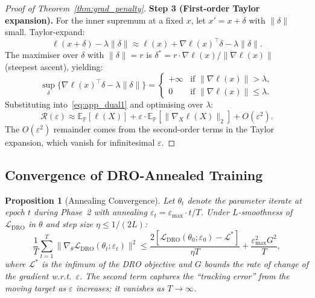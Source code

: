 \documentclass[11pt]{article}
\newtheorem{proposition}[theorem]{Proposition}
\newcommand{\E}{\mathbb{E}}
\newcommand{\PP}{\mathbb{P}}
\begin{document}
\begin{proof}[Proof of Theorem~\ref{thm:grad_penalty}]
\textbf{Step 3 (First-order Taylor expansion).}
For the inner supremum at a fixed $x$, let $x' = x + \delta$ with $\|\delta\|$ small.  Taylor-expand:
\begin{equation}
    \ell(x+\delta) - \lambda\|\delta\| \approx \ell(x) + \nabla\ell(x)^\top\delta - \lambda\|\delta\|.
\end{equation}
The maximiser over $\delta$ with $\|\delta\| = r$ is $\delta^* = r\cdot\nabla\ell(x)/\|\nabla\ell(x)\|$ (steepest ascent), yielding:
\begin{equation}
    \sup_\delta\bigl\{\nabla\ell(x)^\top\delta - \lambda\|\delta\|\bigr\} = \begin{cases} +\infty & \text{if } \|\nabla\ell(x)\| > \lambda, \\ 0 & \text{if } \|\nabla\ell(x)\| \le \lambda. \end{cases}
\end{equation}
Substituting into~\eqref{eq:app_dual1} and optimising over $\lambda$:
\begin{equation}
    \mathcal{R}(\varepsilon) \approx \E_\PP[\ell(X)] + \varepsilon\cdot\E_\PP[\|\nabla_X\ell(X)\|_2] + O(\varepsilon^2).
\end{equation}
The $O(\varepsilon^2)$ remainder comes from the second-order terms in the Taylor expansion, which vanish for infinitesimal $\varepsilon$.
\end{proof}

\subsection{Convergence of DRO-Annealed Training}

\begin{proposition}[Annealing Convergence]
\label{prop:app_convergence}
Let $\theta_t$ denote the parameter iterate at epoch $t$ during Phase~2 with annealing $\varepsilon_t = \varepsilon_{\max}\cdot t/T$.  Under $L$-smoothness of $\mathcal{L}_{\mathrm{DRO}}$ in $\theta$ and step size $\eta \le 1/(2L)$:
\begin{equation}
    \frac{1}{T}\sum_{t=1}^{T}\|\nabla_\theta\mathcal{L}_{\mathrm{DRO}}(\theta_t;\varepsilon_t)\|^2 \le \frac{2[\mathcal{L}_{\mathrm{DRO}}(\theta_0;\varepsilon_0) - \mathcal{L}^*]}{\eta T} + \frac{\varepsilon_{\max}^2 G^2}{T},
\end{equation}
where $\mathcal{L}^*$ is the infimum of the DRO objective and $G$ bounds the rate of change of the gradient w.r.t.\ $\varepsilon$.  The second term captures the ``tracking error'' from the moving target as $\varepsilon$ increases; it vanishes as $T \to \infty$.
\end{proposition}
\end{document}
